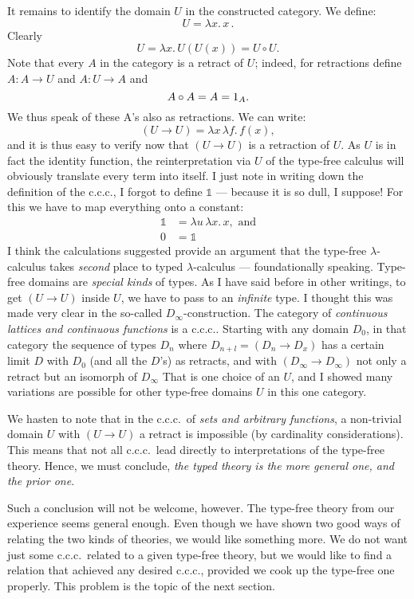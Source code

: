 \documentclass[12pt]{article}
\def\to{\rightarrow}
\def\id{{\textrm 1}}
\def\comp{\circ}
\def\bbone{\mathbb 1}
\def\zeromap{0}
\def\ccc{{c.c.c.}}
\def\l{\lambda}
\def\lm#1.#2{\lambda#1.\, #2}
\def\U{U}
\def\D{D}
\def\lmm#1#2.#3{\l #1\, \l #2 . \, #3}
\begin{document}
It remains to identify the domain $\U$ in the constructed category. We define:
$$
\U = \lm{x}. x\, .
$$
Clearly
$$
\U = \lm{x}.U(U(x)) = \U \comp \U .
$$
Note that every $A$ in the category is a retract of $\U$; indeed, for retractions define $A : A \to \U$ and $A: \U\to A$ and
$$
A \comp A = A = \id_A.
$$
We thus speak of these A's also as retractions. We can write:
$$
(\U\to \U) = \lmm{x}{f}. f(x),
$$
and it is thus easy to verify now that $(\U\to \U)$ is a retraction of $\U$. As $\U$ is in fact the identity function, the reinterpretation via $U$ of the type-free calculus will obviously translate every term into itself.
I just note in writing down the definition of the \ccc, I
forgot to define $\bbone$ --- because it is so dull, I suppose! For this we have to map everything onto a constant:
\begin{align*}
\bbone &= \lmm{u}{x}.x, {\textrm{ and}} \\
\zeromap &= \bbone
\end{align*}
I think the calculations suggested provide an argument that the type-free $\l$-calculus takes {\it second} place to typed $\l$-calculus --- foundationally speaking. Type-free domains are \emph{special kinds} of types. As I have said before in other writings, to get $(\U \to \U)$ inside $U$, we have to pass to an {\it infinite} type. I thought this was made very clear in the so-called $\D_{\infty}$-construction. The category of \emph{continuous lattices and continuous functions} is a \ccc. Starting with any domain $\D_0$, in that category the sequence of types $\D_n$ where $\D_{n+l} =  (\D_n \to \D_x)$  has a certain limit $\D$ with $\D_0$ (and all the $\D$'s) as retracts, and with $(\D_\infty \to \D_\infty)$ not only a retract but an isomorph of $\D_\infty$
That is one choice of an $\U$, and I showed many variations are possible for other type-free domains $U$ in this one category.

We hasten to note that in the \ccc\ of {\it sets and arbitrary functions}, a non-trivial domain $\U$ with $(\U\to \U)$ a retract is impossible (by cardinality considerations). This means that not all \ccc\ lead directly to interpretations of the type-free theory. Hence, we must conclude, {\it the typed theory is the more general one, and the prior one}.

Such a conclusion will not be welcome, however. The type-free theory from our experience seems general enough. Even though we have shown two good ways of relating the two kinds of theories, we would like something more. We do not want just some \ccc\ related to a given type-free theory, but we would like to find a relation that achieved any desired \ccc, provided we cook up the type-free one properly. This problem is the topic of the next section.
\end{document}
